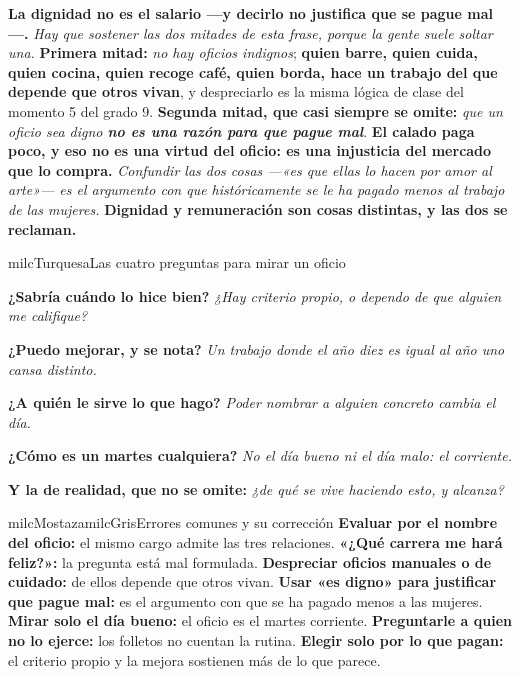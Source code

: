\documentclass[11pt,letterpaper]{article}
\newcommand{\milcpaso}[3]{%
\Needspace{4\baselineskip}%
\begin{tcolorbox}[enhanced,colback=white,colframe=milcLinea,arc=1.5mm,boxrule=.9pt,
  left=14mm,right=4mm,top=3mm,bottom=3mm,before skip=4pt,after skip=4pt,
  fontupper=\RaggedRight,
  overlay={\node[anchor=north west,circle,fill=#2,text=white,inner sep=0pt,
    minimum size=7.4mm,font=\sffamily\bfseries\small]
    at ([xshift=3.6mm,yshift=-3.2mm]frame.north west) {#1};}]
#3
\end{tcolorbox}}
\begin{document}
\milcpaso{4}{milcTurquesa}{\textbf{La dignidad no es el salario ---y decirlo no justifica que se pague mal---.} \emph{Hay que sostener las dos mitades de esta frase, porque la gente suele soltar una.} \textbf{Primera mitad:} \emph{no hay oficios indignos}; \textbf{quien barre, quien cuida, quien cocina, quien recoge café, quien borda, hace un trabajo del que depende que otros vivan}, y despreciarlo es la misma lógica de clase del momento 5 del grado 9. \textbf{Segunda mitad, que casi siempre se omite:} \emph{que un oficio sea digno \textbf{no es una razón para que pague mal}}. \textbf{El calado paga poco, y eso no es una virtud del oficio: es una injusticia del mercado que lo compra.} \emph{Confundir las dos cosas ---«es que ellas lo hacen por amor al arte»--- es el argumento con que históricamente se le ha pagado menos al trabajo de las mujeres.} \textbf{Dignidad y remuneración son cosas distintas, y las dos se reclaman.}}

\begin{drawbox}{milcTurquesa}{Las cuatro preguntas para mirar un oficio}
\begin{pasoslista}
\item \textbf{¿Sabría cuándo lo hice bien?} \emph{¿Hay criterio propio, o dependo de que alguien me califique?}
\item \textbf{¿Puedo mejorar, y se nota?} \emph{Un trabajo donde el año diez es igual al año uno cansa distinto.}
\item \textbf{¿A quién le sirve lo que hago?} \emph{Poder nombrar a alguien concreto cambia el día.}
\item \textbf{¿Cómo es un martes cualquiera?} \emph{No el día bueno ni el día malo: el corriente.}
\item \textbf{Y la de realidad, que no se omite:} \emph{¿de qué se vive haciendo esto, y alcanza?}
\end{pasoslista}
\end{drawbox}

\begin{softbox}{milcMostaza}{milcGris}{Errores comunes y su corrección}
\textbf{Evaluar por el nombre del oficio:} el mismo cargo admite las tres relaciones. \textbf{«¿Qué carrera me hará feliz?»:} la pregunta está mal formulada. \textbf{Despreciar oficios manuales o de cuidado:} de ellos depende que otros vivan. \textbf{Usar «es digno» para justificar que pague mal:} es el argumento con que se ha pagado menos a las mujeres. \textbf{Mirar solo el día bueno:} el oficio es el martes corriente. \textbf{Preguntarle a quien no lo ejerce:} los folletos no cuentan la rutina. \textbf{Elegir solo por lo que pagan:} el criterio propio y la mejora sostienen más de lo que parece.
\end{softbox}
\end{document}
